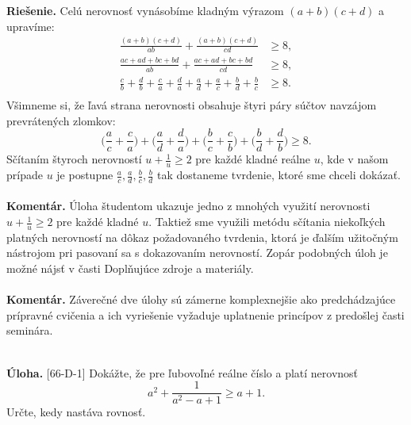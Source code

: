 \documentclass[11pt,a4paper,oneside,final]{book}
\newcommand{\kom}{\textbf{Komentár.} }
\newcommand{\ul}{\textbf{Úloha.} }
\newcommand{\rie}{\textbf{Riešenie.} }
\begin{document}
\rie Celú nerovnosť vynásobíme kladným výrazom $(a+b)(c+d)$ a upravíme:
\begin{align*}
\frac{(a+b)(c+d)}{ab} + \frac{(a+b)(c+d)}{cd} &\geq 8, \\
\frac{ac+ad+bc+bd}{ab}+\frac{ac+ad+bc+bd}{cd} & \geq 8,\\
\frac{c}{b}+\frac{d}{b}+\frac{c}{a}+\frac{d}{a}+\frac{a}{d}+\frac{a}{c}+\frac{b}{d}+\frac{b}{c} &\geq 8.\\
\end{align*}
Všimneme si, že ľavá strana nerovnosti obsahuje štyri páry súčtov navzájom prevrátených zlomkov:
$$\bigg( \frac{a}{c}+ \frac{c}{a} \bigg)+\bigg( \frac{a}{d}+ \frac{d}{a} \bigg)+\bigg( \frac{b}{c}+ \frac{c}{b} \bigg)+\bigg( \frac{b}{d}+ \frac{d}{b} \bigg) \geq 8.$$
Sčítaním štyroch nerovností $u+\frac{1}{u} \geq 2$ pre každé kladné reálne $u$, kde v našom prípade $u$ je postupne $\frac{a}{c}, \frac{a}{d}, \frac{b}{c}, \frac{b}{d}$ tak dostaneme tvrdenie, ktoré sme chceli dokázať.\\
\\
\kom Úloha študentom ukazuje jedno z mnohých využití nerovnosti $u+\frac{1}{u} \geq 2$ pre každé kladné $u$. Taktiež sme využili metódu sčítania niekoľkých platných nerovností na dôkaz požadovaného tvrdenia, ktorá je ďalším užitočným nástrojom pri pasovaní sa s dokazovaním nerovností. Zopár podobných úloh je možné nájsť v časti Doplňujúce zdroje a materiály. \\
\\
\kom Záverečné dve úlohy sú zámerne komplexnejšie ako predchádzajúce prípravné cvičenia a ich vyriešenie vyžaduje uplatnenie princípov z predošlej časti seminára. \\
\\
\begin{tcolorbox}[breakable,notitle,boxrule=0pt,colback=light-gray,colframe=light-gray]\ul [66-D-1] Dokážte, že pre ľubovoľné reálne číslo a platí nerovnosť $$a^2+\frac{1}{a^2-a+1}\geq a+1.$$ Určte, kedy nastáva rovnosť.

\end{tcolorbox}
\end{document}
